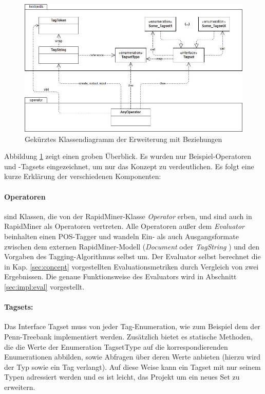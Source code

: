  
\begin{figure}[htb]
	\captionsetup{justification=centering,margin=2cm}
	\includegraphics[width=\textwidth]{gfx/uml_rough.jpg}
	\caption{Gekürztes Klassendiagramm der Erweiterung mit Beziehungen}
	\label{fig:impl:structure:overview}
\end{figure}

Abbildung \ref{fig:impl:structure:overview} zeigt einen groben Überblick. Es wurden nur Beispiel-Operatoren und -Tagsets eingezeichnet, um nur das Konzept zu verdeutlichen. Es folgt eine kurze Erklärung der verschiedenen Komponenten:

\paragraph{Operatoren} sind Klassen, die von der RapidMiner-Klasse \textit{Operator} erben, und sind auch in RapidMiner als Operatoren vertreten. Alle Operatoren außer dem \textit{Evaluator} beinhalten einen POS-Tagger und wandeln Ein- als auch Ausgangsformate zwischen dem externen RapidMiner-Modell (\textit{Document} oder \textit{TagString} ) und den Vorgaben des Tagging-Algorithmus selbst um. Der Evaluator selbst berechnet die in Kap. \ref{sec:concept} vorgestellten Evaluationsmetriken durch Vergleich von zwei Ergebnissen. Die genaue Funktionsweise des Evaluators wird in Abschnitt \ref{sec:impl:eval} vorgestellt.

\paragraph{Tagsets:} Das Interface Tagset muss von jeder Tag-Enumeration, wie zum Beispiel dem der Penn-Treebank implementiert werden. Zusätzlich bietet es statische Methoden, die die Werte der Enumeration TagsetType auf die korrespondierenden Enumerationen abbilden, sowie Abfragen über deren Werte anbieten (hierzu wird der Typ sowie ein Tag verlangt). Auf diese Weise kann ein Tagset mit nur seinem Typen adressiert werden und es ist leicht, das Projekt um ein neues Set zu erweitern.


